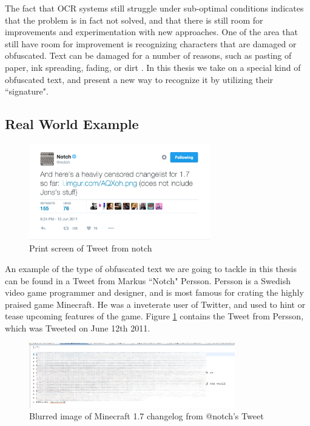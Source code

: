 The fact that OCR systems still struggle under sub-optimal conditions indicates that the problem is in fact not solved, and that there is still room for improvements and experimentation with new approaches. One of the area that still have room for improvement is recognizing characters that are damaged or obfuscated. Text can be damaged for a number of reasons, such as pasting of paper, ink spreading, fading, or dirt \citep{bhardwaj2014imaging}. In this thesis we take on a special kind of obfuscated text, and present a new way to recognize it by utilizing their ``signature".

\subsection{Real World Example}
\begin{figure}[ht]
    \centering
    \includegraphics[width=0.7\textwidth]{fig/chapter1/notch_tweet.png}
    \caption[Print screen of Tweet from notch]{Print screen of Tweet from notch}
    \label{ref:notch_twitter}
\end{figure}

An example of the type of obfuscated text we are going to tackle in this thesis can be found in a Tweet from Markus ``Notch" Persson. Persson is a Swedish video game programmer and designer, and is most famous for crating the highly praised game Minecraft. He was a inveterate user of Twitter, and used to hint or tease upcoming features of the game. Figure \ref{ref:notch_twitter} contains the Tweet from Persson, which was Tweeted on June 12th 2011.

\begin{figure}[ht]
    \centering
    \includegraphics[width=0.8\textwidth]{fig/chapter1/notch_eclipse.png}
    \caption{Blurred image of Minecraft 1.7 changelog from @notch's Tweet}
    \label{fig:notch_imgur}
\end{figure}

